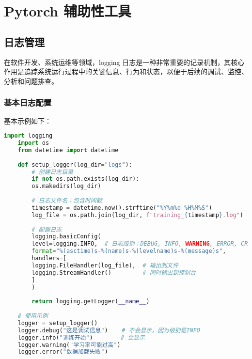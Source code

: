\section{Pytorch 辅助性工具}

\subsection{日志管理}
在软件开发、系统运维等领域，logging 日志是一种非常重要的记录机制，其核心作用是追踪系统运行过程中的关键信息、行为和状态，以便于后续的调试、监控、分析和问题排查。
\subsubsection{基本日志配置}
基本示例如下：
\begin{lstlisting}[language=python,caption={基本日志配置},label=code:log_configuration]
	import logging
	import os
	from datetime import datetime
	
	def setup_logger(log_dir="logs"):
		# 创建日志目录
		if not os.path.exists(log_dir):
		os.makedirs(log_dir)
	
		# 日志文件名：包含时间戳
		timestamp = datetime.now().strftime("%Y%m%d_%H%M%S")
		log_file = os.path.join(log_dir, f"training_{timestamp}.log")
	
		# 配置日志
		logging.basicConfig(
		level=logging.INFO,  # 日志级别：DEBUG, INFO, WARNING, ERROR, CRITICAL
		format="%(asctime)s-%(name)s-%(levelname)s-%(message)s",
		handlers=[
		logging.FileHandler(log_file),  # 输出到文件
		logging.StreamHandler()         # 同时输出到控制台
		]
		)
	
		return logging.getLogger(__name__)
	
	# 使用示例
	logger = setup_logger()
	logger.debug("这是调试信息")    # 不会显示，因为级别是INFO
	logger.info("训练开始")        # 会显示
	logger.warning("学习率可能过高")
	logger.error("数据加载失败")
\end{lstlisting}


